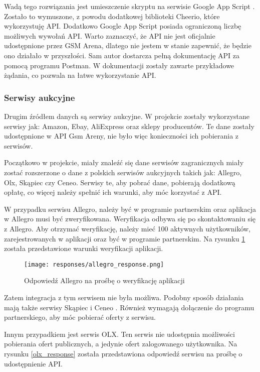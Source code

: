Wadą tego rozwiązania jest umieszczenie skryptu na serwisie Google App Script \cite{google_app_script}. Zostało to wymuszone, z powodu dodatkowej biblioteki Cheerio, które wykorzystuję API. Dodatkowo Google App Script posiada ograniczoną liczbę możliwych wywołań API. Warto zaznaczyć, że API nie jest oficjalnie udostępnione przez GSM Arena, dlatego nie jestem w stanie zapewnić, że będzie ono działało w przyszłości. Sam autor dostarcza pełną dokumentację API za pomocą programu Postman. W dokumentacji \cite{gsm_arena_api_reference} zostały zawarte przykładowe żądania, co pozwala na łatwe wykorzystanie API.

\subsubsection{Serwisy aukcyjne}
Drugim źródłem danych są serwisy aukcyjne. W projekcie zostały wykorzystane serwisy jak: Amazon, Ebay, AliExpress oraz sklepy producentów. Te dane zostały udostępnione w API Gsm Areny, nie było więc konieczności ich pobierania z serwisów.

Początkowo w projekcie, miały znaleźć się dane serwisów zagranicznych miały zostać rozszerzone o dane z polskich serwisów aukcyjnych takich jak: Allegro, Olx, Skąpiec czy Ceneo. Serwisy te, aby pobrać dane, pobierają dodatkową opłatę, co więcej należy spełnić ich warunki, aby móc korzystać z API.

W przypadku serwisu Allegro, należy być w programie partnerskim oraz aplikacja w Allegro musi być zweryfikowana. Weryfikacja odbywa się po skontaktowaniu się z Allegro. Aby otrzymać weryfikację, należy mieć 100 aktywnych użytkowników, zarejestrowanych w aplikacji oraz być w programie partnerskim. Na rysunku \ref*{allegro_verification} została przedstawione warunki weryfikacji aplikacji.

\begin{figure}[H]
    \centering
    \texttt{[image: responses/allegro\_response.png]}
    \caption{Odpowiedź Allegro na prośbę o weryfikację aplikacji}
    \label{allegro_verification}
\end{figure}

Zatem integracja z tym serwisem nie była możliwa. Podobny sposób działania mają także serwisy Skąpiec \cite{skapiec} i Ceneo \cite{ceneo}. Również wymagają dołączenie do programu partnerskiego, aby móc pobierać oferty z serwisu.

Innym przypadkiem jest serwis OLX. Ten serwis nie udostępnia możliwości pobierania ofert publicznych, a jedynie ofert zalogowanego użytkownika. Na rysunku \ref*{olx_response} została przedstawiona odpowiedź serwisu na prośbę o udostępnienie API.

